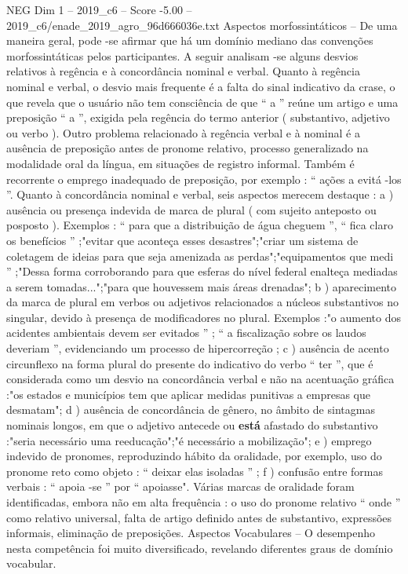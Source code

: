 \begin{textsample}{NEG Dim 1 – 2019\_c6 – Score -5.00 – 2019\_c6/enade\_2019\_agro\_96d666036e.txt}
Aspectos morfossintáticos – De uma maneira geral, pode -se afirmar que há um domínio mediano das convenções morfossintáticas pelos participantes.
A seguir analisam -se alguns desvios relativos à regência e à concordância nominal e verbal.
Quanto à regência nominal e verbal, o desvio mais frequente é a falta do sinal indicativo da crase, o que revela que o usuário não tem consciência de que “ a ” reúne um artigo e uma preposição “ a ”, exigida pela regência do termo anterior ( substantivo, adjetivo ou verbo ).
Outro problema relacionado à regência verbal e à nominal é a ausência de preposição antes de pronome relativo, processo generalizado na modalidade oral da língua, em situações de registro informal.
Também é recorrente o emprego inadequado de preposição, por exemplo : “ ações a evitá -los ”.
Quanto à concordância nominal e verbal, seis aspectos merecem destaque : a ) ausência ou presença indevida de marca de plural ( com sujeito anteposto ou posposto ).
Exemplos : “ para que a distribuição de água cheguem ”, “ fica claro os benefícios ” ;"evitar que aconteça esses desastres";"criar um sistema de coletagem de ideias para que seja amenizada as perdas";"equipamentos que medi ” ;"Dessa forma corroborando para que esferas do nível federal enalteça mediadas a serem tomadas...";"para que houvessem mais áreas drenadas"; b ) aparecimento da marca de plural em verbos ou adjetivos relacionados a núcleos substantivos no singular, devido à presença de modificadores no plural.
Exemplos :"o aumento dos acidentes ambientais devem ser evitados ” ; “ a fiscalização sobre os laudos deveriam ”, evidenciando um processo de hipercorreção ; c ) ausência de acento circunflexo na forma plural do presente do indicativo do verbo “ ter ”, que é considerada como um desvio na concordância verbal e não na acentuação gráfica :"os estados e municípios tem que aplicar medidas punitivas a empresas que desmatam"; d ) ausência de concordância de gênero, no âmbito de sintagmas nominais longos, em que o adjetivo antecede ou \textbf{está} afastado do substantivo :"seria necessário uma reeducação";"é necessário a mobilização"; e ) emprego indevido de pronomes, reproduzindo hábito da oralidade, por exemplo, uso do pronome reto como objeto : “ deixar elas isoladas ” ; f ) confusão entre formas verbais : “ apoia -se ” por “ apoiasse".
Várias marcas de oralidade foram identificadas, embora não em alta frequência : o uso do pronome relativo “ onde ” como relativo universal, falta de artigo definido antes de substantivo, expressões informais, eliminação de preposições.
Aspectos Vocabulares – O desempenho nesta competência foi muito diversificado, revelando diferentes graus de domínio vocabular.

\end{textsample}

